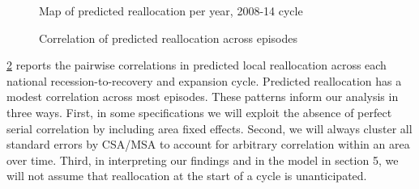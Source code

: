 \documentclass[12pt]{article}
\theoremstyle{definition}
\begin{document}
\renewcommand{\thefigure}{\arabic{figure}}
\setcounter{figure}{1}   
\begin{figure}[H]
    \noindent\caption{Map of predicted reallocation per year, 2008-14 cycle}
    \begin{center}
        \label{chodorow-reichSecularLaborReallocation2020_fig2}
    \end{center}
\end{figure}

\renewcommand{\thefigure}{Table \arabic{figure}}
\setcounter{figure}{1}   
\begin{figure}[H]
    \noindent\caption{Correlation of predicted reallocation across episodes}
    \begin{center}
        \label{chodorow-reichSecularLaborReallocation2020_tab2}
    \end{center}
\end{figure}

\ref{chodorow-reichSecularLaborReallocation2020_tab2} reports the pairwise correlations in predicted local reallocation across each national recession-to-recovery and expansion cycle. Predicted reallocation has a modest correlation across most episodes. These patterns inform our analysis in three ways. First, in some specifications we will exploit the absence of perfect serial correlation by including area fixed effects. Second, we will always cluster all standard errors by CSA/MSA to account for arbitrary correlation within an area over time. Third, in interpreting our findings and in the model in section 5, we will not assume that reallocation at the start of a cycle is unanticipated.
\end{document}
